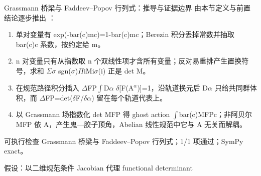 \begin{frame}[t]{Grassmann 桥梁与 Faddeev--Popov 行列式：推导与证据边界}
\footnotesize
{}\quad 由本节定义与前置结论逐步推出 ：
\begin{enumerate}
\item 单对变量有 exp(-bar(c)mc)=1-bar(c)mc；Berezin 积分丢掉常数并抽取 bar(c)c 系数，按约定给 m。
\item n 对变量只有从指数取 n 个双线性项才含所有变量；反对易重排产生置换符号，求和 \ensuremath{\Sigma}\ensuremath{\sigma} sgn(\ensuremath{\sigma})\ensuremath{\Pi}iMi\ensuremath{\sigma}(i) 正是 det M。
\item 在规范路径积分插入 \ensuremath{\Delta}FP\ensuremath{\int}D\ensuremath{\alpha} \ensuremath{\delta}[F(A\ensuremath{^{\alpha}})]=1，沿轨道换元后 D\ensuremath{\alpha} 只给共同群体积，而 \ensuremath{\Delta}FP=det(\ensuremath{\delta}F/\allowbreak{}\ensuremath{\delta}\ensuremath{\alpha}) 留在每个轨道代表上。
\item 以 Grassmann 场指数化 det MFP 得 ghost action \ensuremath{\int}bar(c)MFPc；非阿贝尔 MFP 依 A，产生鬼—胶子顶角，Abelian 线性规范中它与 A 无关而解耦。
\end{enumerate}\begin{block}{可执行检查}
\quad Grassmann 桥梁与 Faddeev--Popov 行列式；1/1 项通过；SymPy exact。
\par\scriptsize 假设：以二维规范条件 Jacobian 代理 functional determinant
\end{block}
\end{frame}

